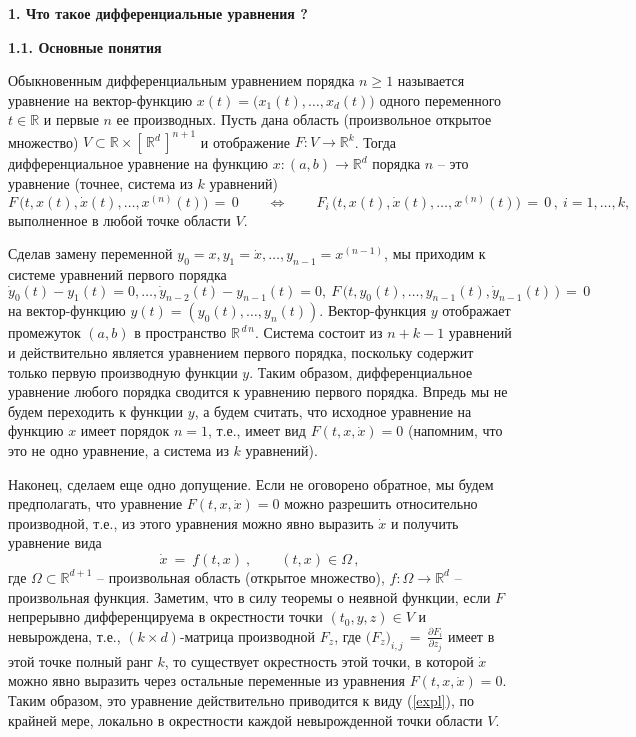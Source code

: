 \documentclass[12pt,a4paper]{article}
\newcommand{\re}{{\mathbb R}}
\begin{document}
\newpage

\begin{center}
\large{\textbf{1. Что такое дифференциальные уравнения ?}}
\end{center}

\bigskip

\begin{center}
\textbf{1.1. Основные понятия}
\end{center}
\medskip


Обыкновенным дифференциальным уравнением порядка $n \ge 1$ называется уравнение на вектор-функцию
$x(t) = \bigl(x_1(t), \ldots , x_d(t) \bigr)$ одного переменного $t \in \re$ и первые $n$ ее производных. Пусть дана область (произвольное открытое множество)
$V \subset \re\times [\, \re^{d}\, ]^{n+1}$ и отображение  $F: V \to \re^k$. Тогда дифференциальное уравнение на функцию
$x: (a, b) \to \re^d$ порядка $n$ -- это уравнение (точнее, система из $k$ уравнений)
$$
F\, \bigl(t, x(t), \dot x(t), \ldots , x^{(n)}(t)\bigr) \, = \, 0 \qquad \Leftrightarrow \qquad
F_i\, \bigl(t, x(t), \dot x(t), \ldots , x^{(n)}(t)\bigr) \, = \, 0\, , \ i = 1, \ldots , k,
$$
 выполненное в любой точке области $V$.

Сделав замену переменной $y_0 = x, y_1  = \dot x, \ldots , y_{n-1} = x^{(n-1)}$, мы приходим к системе уравнений
первого порядка
$$
\dot y_0(t) - y_1(t) = 0, \ldots , \dot y_{n-2}(t) - y_{n-1}(t) = 0, \ F\, \bigl(t, y_0(t), \ldots , y_{n-1}(t), \dot y_{n-1}(t)\, \bigr) \, = \, 0
$$
 на вектор-функцию $y(t) = (y_0(t), \ldots , y_n(t))$. Вектор-функция $y$ отображает промежуток $(a,b)$
в пространство $\re^{\, d \, n}$. Система состоит из $n+k-1$ уравнений и действительно является уравнением первого порядка, поскольку содержит только первую производную функции $y$. Таким образом, дифференциальное уравнение любого порядка сводится к уравнению первого порядка. Впредь мы не будем переходить к функции $y$, а будем считать, что исходное уравнение на функцию $x$
имеет порядок $n=1$, т.е., имеет вид $F(t, x, \dot x) = 0$ (напомним, что это не одно уравнение, а система из $k$ уравнений).

Наконец, сделаем еще одно допущение. Если не оговорено обратное,
мы будем предполагать, что уравнение $F(t, x, \dot x) = 0$ можно разрешить относительно производной, т.е.,
из этого уравнения можно явно выразить $\dot x$ и получить уравнение вида
\begin{equation}\label{expl}
\dot x \ = \ f(t, x)\ , \qquad (t, x) \in \Omega\, ,
\end{equation}
где $\Omega \subset \re^{d+1}$ -- произвольная область (открытое множество), $f: \Omega \to \re^d$ -- произвольная функция.
Заметим, что в силу теоремы о неявной функции, если $F$ непрерывно дифференцируема в окрестности точки
$(t_0, y, z) \in V$ и невырождена, т.е., $(k\times d)$-матрица производной 
$F_{z}$, где  $\bigl(F_{z}\bigr)_{i, j}\, = \, \frac{\partial F_i}{\partial z_j}$
имеет в этой точке полный ранг $k$, то существует окрестность этой точки, в которой $\dot x$ можно явно выразить через
остальные переменные из уравнения $F(t, x, \dot x) = 0$. Таким образом, это уравнение действительно приводится к виду
(\ref{expl}), по крайней мере, локально в окрестности каждой невырожденной точки области $V$.
\smallskip
\newpage
\end{document}
